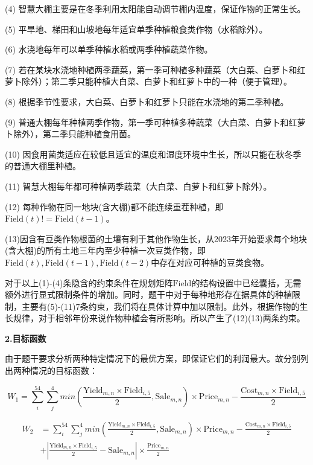 \documentclass{cumcmthesis}
\begin{document}
	(4) 智慧大棚主要是在冬季利用太阳能自动调节棚内温度，保证作物的正常生长。

	(5) 平旱地、梯田和山坡地每年适宜单季种植粮食类作物（水稻除外）。
	
	(6) 水浇地每年可以单季种植水稻或两季种植蔬菜作物。
	
	(7) 若在某块水浇地种植两季蔬菜，第一季可种植多种蔬菜（大白菜、白萝卜和红萝卜除外）；第二季只能种植大白菜、白萝卜和红萝卜中的一种（便于管理）。
	
	(8) 根据季节性要求，大白菜、白萝卜和红萝卜只能在水浇地的第二季种植。
	
	(9) 普通大棚每年种植两季作物，第一季可种植多种蔬菜（大白菜、白萝卜和红萝卜除外），第二季只能种植食用菌。
	
	(10) 因食用菌类适应在较低且适宜的温度和湿度环境中生长，所以只能在秋冬季的普通大棚里种植。
	
	(11) 智慧大棚每年都可种植两季蔬菜（大白菜、白萝卜和红萝卜除外）。

	(12) 每种作物在同一地块(含大棚)都不能连续重茬种植，即$\text{Field}(t)!=\text{Field}(t-1)$。
	
	(13)因含有豆类作物根菌的土壤有利于其他作物生长，从2023年开始要求每个地块(含大棚)的所有土地三年内至少种植一次豆类作物，即$\text{Field}(t),\text{Field}(t-1),\text{Field}(t-2)$中存在对应可种植的豆类食物。
	
	
	对于以上(1)-(4)条隐含的约束条件在规划矩阵$\text{Field}$的结构设置中已经囊括，无需额外进行显式限制条件的增加。同时，题干中对于每种地形存在据具体的种植限制，主要有(5)-(11)7条约束，我们将在具体计算中加以限制。此外，根据作物的生长规律，对于相邻年份来说作物种植会有所影响。所以产生了(12)(13)两条约束。
	
	\textbf{2.目标函数}
	
	由于题干要求分析两种特定情况下的最优方案，即保证它们的利润最大。故分别列出两种情况的目标函数：
	
	$$
	W_1=\sum_{i}^{54} \sum_{j}^{4}min(\frac{ \text{Yield}_{m,n} \times \text{Field}_{i,5}}{2} ,\text{Sale}_{m,n}
	)\times \text{Price}_{m,n}-\frac{ \text{Cost}_{m,n}\times \text{Field}_{i,5}}{2}   
	 $$
	
\begin{equation*}
	\begin{split}
		W_2&=\sum_{i}^{54} \sum_{j}^{4}min(\frac{ \text{Yield}_{m,n} \times \text{Field}_{i,5}}{2} ,\text{Sale}_{m,n}
		)\times \text{Price}_{m,n}-\frac{ \text{Cost}_{m,n}\times \text{Field}_{i,5}}{2} \\ &+\left|\frac{ \text{Yield}_{m,n} \times \text{Field}_{i,5}}{2} -\text{Sale}_{m,n} \right |
		\times \frac{\text{Price}_{m,n}}{2}
	\end{split}
\end{equation*}
\end{document}
